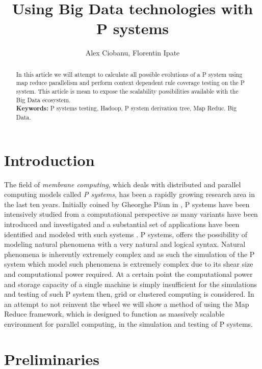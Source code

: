\documentclass[runningheads]{llncs}
\title{Using Big Data technologies with P systems}
\author{Alex Ciobanu\inst{1}, Florentin Ipate\inst{1}}
\institute{Department of Computer Science, University of Pitesti\\
Str. Targu din Vale 1, 110040 Pitesti, Romania \\
\email{florentin.ipate@ifsoft.ro}
}
\begin{document}
\maketitle


\begin{abstract} 
In this article we will attempt to calculate all possible evolutions of a P system using map reduce parallelism and perform context dependent rule coverage testing on the P system. This article is mean to expose the scalability possibilities available with the Big Data ecosystem.  \\


\textbf{Keywords:} P systems testing, Hadoop, P system derivation tree, Map Reduc. Big Data.

\end{abstract}



\section{Introduction}

The field of \emph{membrane computing}, which deals with distributed and parallel computing models called \emph{P systems}, has been a rapidly growing research area in the last ten years. Initially coined by Gheorghe P\u{a}un in \cite{Paun00}, P systems have been intensively studied from a computational perspective as many variants have been introduced and investigated and a substantial set of applications have been identified and modeled with such systems \cite{PaunRS10}. P systems, offers the possibility of modeling natural phenomena with a very natural and logical syntax. Natural phenomena is inherently extremely complex and as such the simulation of the P system which model such phenomena is extremely complex due to its shear size and computational power required. At a certain point the computational power and storage capacity of a single machine is simply insufficient for the simulations and testing of such P system then, grid or clustered computing is considered. In an attempt to not reinvent the wheel we will show a method of using the Map Reduce framework, which is designed to function as massively scalable environment for parallel computing, in the simulation and testing of P systems. 

\section{Preliminaries}
\end{document}
